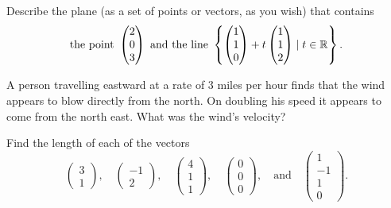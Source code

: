 \begin{exercise}{}{}
 Describe the plane (as a set of points or vectors, as you wish) that contains
 \[
  \text{the point }
  \begin{pmatrix}
   2\\
   0\\
   3
  \end{pmatrix}\text{ and the line }
  \left\{\begin{pmatrix}
   1\\
   1\\
   0
  \end{pmatrix}
  + t
  \begin{pmatrix}
   1\\
   1\\
   2
  \end{pmatrix}
  \mid t \in \mathbb{R} \right\}.
 \]
\end{exercise}

\begin{exercise}{}{} 
 A person travelling eastward at a rate of 3 miles per hour finds that the wind
 appears to blow directly from the north. On doubling his speed it appears to
 come from the north east. What was the wind’s velocity?
\end{exercise}

\begin{exercise}{}{}
 Find the length of each of the vectors
 \[
  \begin{pmatrix}
   3\\
   1
  \end{pmatrix}, \quad 
  \begin{pmatrix}
   -1\\
   2
  \end{pmatrix}, \quad 
  \begin{pmatrix}
   4\\
   1\\
   1
  \end{pmatrix}, \quad 
  \begin{pmatrix}
   0\\
   0\\
   0
  \end{pmatrix}, \quad \text{and} \quad 
  \begin{pmatrix}
   1\\
   -1\\
   1\\
   0
  \end{pmatrix}.
 \]
\end{exercise}

